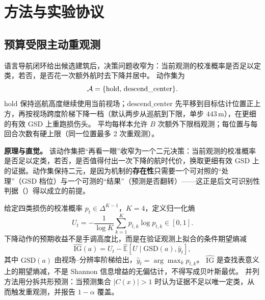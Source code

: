 \section{方法与实验协议}
\label{sec:method}

\subsection{预算受限主动重观测}
\label{sec:baro}
语言导航闭环给出候选建筑后，决策问题收窄为：当前观测的校准概率是否足以定类，若否，是否花一次额外航时去下降并居中。
动作集为
\begin{equation}
\mathcal{A}=\{\mathrm{hold},\,\mathrm{descend\_center}\}.
\end{equation}
$\mathrm{hold}$ 保持巡航高度继续使用当前视场；$\mathrm{descend\_center}$ 先平移到目标估计位置正上方，再按视场跨度阶梯下降一档（默认两步从巡航到下限，单步 $443\,\mathrm{m}$），在更细的有效 GSD 上重跑损伤头。
平均每样本允许 $B$ 次额外下限档观测；每位置与每回合次数有硬上限（同一位置最多 2 次重观测）。

\textbf{原理与直觉。} 该动作集把``再看一眼''收窄为一个二元决策：当前观测的校准概率是否足以定类，若否，是否值得付出一次下降的航时代价，换取更细有效 GSD 上的证据。动作集保持二元，是因为机制的\textbf{存在性}只需要一个可对照的``处理''（GSD 档位）与一个可测的``结果''（预测是否翻转）——这正是后文可识别性判据（）得以成立的前提。


给定四类损伤的校准概率 $p_t\in\Delta^{K-1}$，$K=4$，定义归一化熵
\begin{equation}
\label{eq:entropy}
U_t=-\frac{1}{\log K}\sum_{k=1}^{K}p_{t,k}\log p_{t,k}\in[0,1].
\end{equation}
下降动作的预期收益不是手调高度比，而是在验证观测上拟合的条件期望熵减
\begin{equation}
\label{eq:ig}
\widehat{\mathrm{IG}}(a)=U_t-\widehat{\mathbb{E}}[U\mid \mathrm{GSD}(a),\hat y_t],
\end{equation}
其中 $\mathrm{GSD}(a)$ 由视场--分辨率阶梯给出，$\hat y_t=\arg\max_k p_{t,k}$。
$\widehat{\mathrm{IG}}$ 是查找表意义上的期望熵减，不是 Shannon 信息增益的无偏估计，不得写成贝叶斯最优。
并列方法用分拆共形预测：当预测集合 $|C(x)|>1$ 时认为证据不足以唯一定类，从而触发重观测，并报告 $1-\alpha$ 覆盖。

